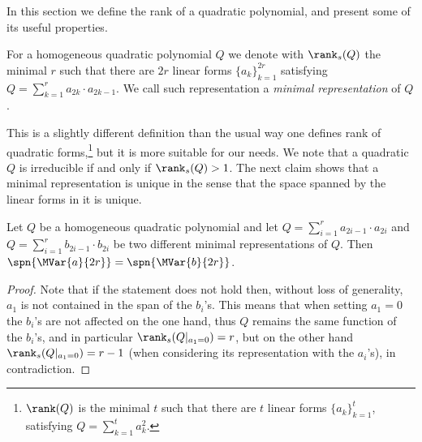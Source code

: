 In this section we define the rank of a quadratic polynomial, and present some of its useful properties.

\begin{definition}\label{def:rank-s}
For a homogeneous quadratic polynomial  $Q$ we denote with $\rank_s(Q)$ the minimal $r$ such that there are $2r$  linear forms $\{a_k\}_{k=1}^{2r}$ satisfying $Q=\sum_{k=1}^r a_{2k}\cdot a_{2k-1}$. We call such representation a \emph{minimal representation} of $Q$.
\end{definition}

This is a slightly different definition than the usual way one defines rank of quadratic forms,\footnote{$\rank(Q)$ is the minimal $t$ such that there are $t$ linear forms $\{a_k\}_{k=1}^{t}$, satisfying $Q=\sum_{k=1}^t a_k^2$.}
but it is more suitable for our needs. We note that a quadratic $Q$ is irreducible if and only if $\rank_s(Q)>1$. The next claim shows that a minimal representation is unique in the sense that the
space spanned by the linear forms in it is unique.


































\begin{claim}\label{cla:irr-quad-span}
Let $Q$ be a homogeneous quadratic polynomial and let $Q=\sum_{i=1}^{r}a_{2i-1}\cdot a_{2i}$ and $Q = \sum_{i=1}^{r}b_{2i-1}\cdot b_{2i}$ be two different minimal representations of $Q$. Then $\spn{\MVar{a}{2r}} =\spn{\MVar{b}{2r}}$.
\end{claim}

\begin{proof}
Note that if the statement does not hold then,  without loss of generality, $a_1$ is not contained in the span of the $b_i$'s. This means that when setting $a_1=0$ the $b_i$'s are not affected on the one hand, thus $Q$ remains the same function of the $b_i$'s, and in particular $\rank_s(Q|_{a_1=0})=r$, but on the other hand $\rank_s(Q|_{a_1=0})=r-1$ (when considering its representation with the $a_i$'s), in contradiction.
\end{proof}

